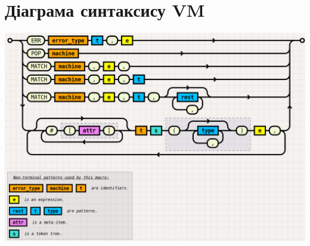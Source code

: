 \documentclass[a4paper]{report}
\begin{document}
\section*{Діаграма синтаксису VM}
\includegraphics[angle=90,width=1\textwidth, height=1.45\textwidth]{vm_syntax}
\newpage
\end{document}
